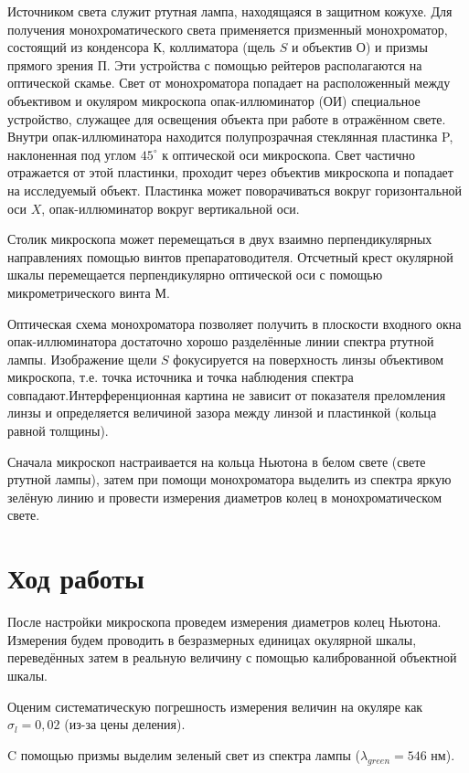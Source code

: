 \documentclass[a4paper,12pt]{article}
\begin{document}
	Источником света служит ртутная лампа, находящаяся в защитном кожухе. Для получения монохроматического света применяется призменный монохроматор, состоящий из конденсора $ К $, коллиматора (щель $ S $ и объектив $ О $) и призмы прямого зрения $ П $. Эти устройства с помощью рейтеров располагаются на оптической скамье. Свет от монохроматора попадает на расположенный между объективом и окуляром микроскопа опак-иллюминатор (ОИ)  специальное устройство, служащее для освещения объекта при работе в отражённом свете. Внутри опак-иллюминатора находится полупрозрачная стеклянная пластинка P, наклоненная под углом $ 45^\circ $ к оптической оси микроскопа. Свет частично отражается от этой пластинки, проходит через объектив микроскопа и попадает на исследуемый объект. Пластинка может поворачиваться вокруг горизонтальной оси $ X $, опак-иллюминатор вокруг вертикальной оси.

	Столик микроскопа может перемещаться в двух взаимно перпендикулярных направлениях помощью винтов препаратоводителя. Отсчетный крест окулярной шкалы перемещается перпендикулярно оптической оси с помощью микрометрического винта $ М $.
	
	Оптическая схема монохроматора позволяет получить в плоскости входного окна опак-иллюминатора достаточно хорошо разделённые линии спектра ртутной лампы. Изображение щели $ S $ фокусируется на поверхность линзы объективом микроскопа, т.е. точка источника и точка наблюдения спектра совпадают.Интерференционная картина не зависит от показателя преломления линзы и определяется величиной зазора между линзой и пластинкой (кольца равной толщины).

	Сначала микроскоп настраивается на кольца Ньютона в белом свете (свете ртутной лампы), затем при помощи монохроматора выделить из спектра яркую зелёную линию и провести измерения диаметров колец в монохроматическом свете. 

\section*{Ход работы}
	
	После настройки микроскопа проведем измерения диаметров колец Ньютона. Измерения будем проводить в безразмерных единицах окулярной шкалы, переведённых затем в реальную величину с помощью калиброванной объектной шкалы. 
	
	
	Оценим систематическую погрешность измерения величин на окуляре как $ \sigma_l = 0,02 $ (из-за цены деления).
	
	C помощью призмы выделим зеленый свет из спектра лампы ($ \lambda_{green} = 546 $ нм).
	
\end{document}
